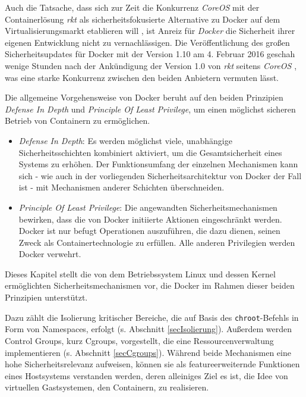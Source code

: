 \documentclass[../main.tex]{subfiles}
\begin{document}
	Auch die Tatsache, dass sich zur Zeit die Konkurrenz \emph{CoreOS} mit der Containerlösung \emph{rkt} als sicherheitsfokusierte Alternative zu Docker auf dem Virtualisierungsmarkt etablieren will \cite{coreosAnnouncementRkt10}, ist Anreiz für \emph{Docker} die Sicherheit ihrer eigenen Entwicklung nicht zu vernachlässigen. Die Veröffentlichung des großen Sicherheitsupdates für Docker mit der Version 1.10 am 4. Februar 2016 geschah wenige Stunden nach der Ankündigung der Version 1.0 von \emph{rkt} seitens \emph{CoreOS} \cite{hnAnnouncementDocker110}\cite{hnAnnouncementRkt10}, was eine starke Konkurrenz zwischen den beiden Anbietern vermuten lässt. %

	Die allgemeine Vorgehensweise von Docker beruht auf den beiden Prinzipien \emph{Defense In Depth} und \emph{Principle Of Least Privilege}, um einen möglichst sicheren Betrieb von Containern zu ermöglichen.

	\begin{itemize}
			\item \emph{Defense In Depth}: Es werden möglichst viele, unabhängige Sicherheitsschichten kombiniert aktiviert, um die Gesamtsicherheit eines Systems zu erhöhen. Der Funktionsumfang der einzelnen Mechanismen kann sich - wie auch in der vorliegenden Sicherheitsarchitektur von Docker der Fall ist - mit Mechanismen anderer Schichten überschneiden.
			\item \emph{Principle Of Least Privilege}: Die angewandten Sicherheitsmechanismen bewirken, dass die von Docker initiierte Aktionen eingeschränkt werden. Docker ist nur befugt Operationen auszuführen, die dazu dienen, seinen Zweck als Containertechnologie zu erfüllen. Alle anderen Privilegien werden Docker verwehrt.
	\end{itemize}


	Dieses Kapitel stellt die von dem Betriebssystem Linux und dessen Kernel ermöglichten Sicherheitsmechanismen vor, die Docker im Rahmen dieser beiden Prinzipien unterstützt.

	Dazu zählt die Isolierung kritischer Bereiche, die auf Basis des \texttt{chroot}-Befehls in Form von Namespaces, erfolgt (s. Abschnitt \ref{secIsolierung}). Außerdem werden Control Groups, kurz Cgroups, vorgestellt, die eine Ressourcenverwaltung implementieren (s. Abschnitt \ref{secCgroups}). Während beide Mechanismen eine hohe Sicherheitsrelevanz aufweisen, können sie als featureerweiternde Funktionen eines Hostsystems verstanden werden, deren alleiniges Ziel es ist, die Idee von virtuellen Gastsystemen, den Containern, zu realisieren. %
\end{document}
